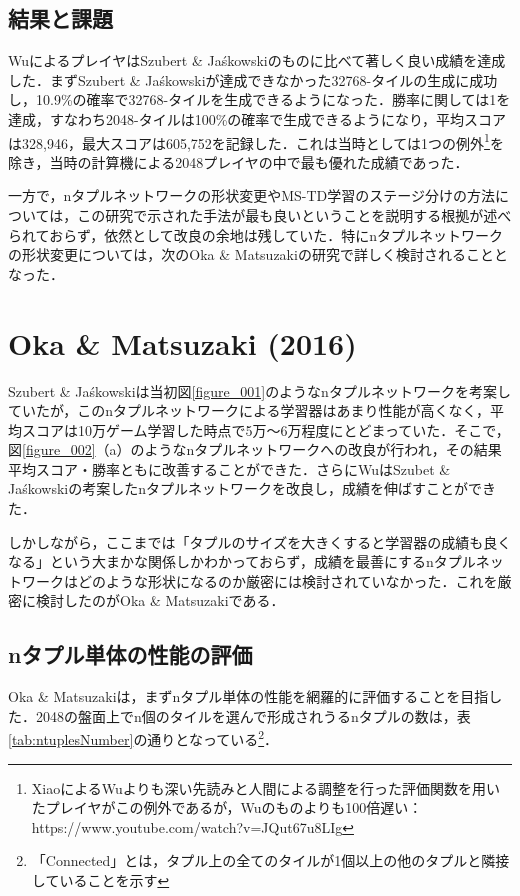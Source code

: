 \documentclass{suribt}
\begin{document}
\subsection{結果と課題}
WuによるプレイヤはSzubert \& Ja\'{s}kowskiのものに比べて著しく良い成績を達成した．まずSzubert \& Ja\'{s}kowskiが達成できなかった32768-タイルの生成に成功し，10.9\%の確率で32768-タイルを生成できるようになった．勝率に関しては1を達成，すなわち2048-タイルは100\%の確率で生成できるようになり，平均スコアは328,946，最大スコアは605,752を記録した．これは当時としては1つの例外\footnote{XiaoによるWuよりも深い先読みと人間による調整を行った評価関数を用いたプレイヤがこの例外であるが，Wuのものよりも100倍遅い：https://www.youtube.com/watch?v=JQut67u8LIg}を除き，当時の計算機による2048プレイヤの中で最も優れた成績であった．

一方で，nタプルネットワークの形状変更やMS-TD学習のステージ分けの方法については，この研究で示された手法が最も良いということを説明する根拠が述べられておらず，依然として改良の余地は残していた．特にnタプルネットワークの形状変更については，次のOka \& Matsuzakiの研究で詳しく検討されることとなった．

\section{Oka \& Matsuzaki (2016)}
Szubert \& Ja\'{s}kowskiは当初図\ref{figure_001}のようなnタプルネットワークを考案していたが，このnタプルネットワークによる学習器はあまり性能が高くなく，平均スコアは10万ゲーム学習した時点で5万〜6万程度にとどまっていた．そこで，図\ref{figure_002}（a）のようなnタプルネットワークへの改良が行われ，その結果平均スコア・勝率ともに改善することができた．さらにWuはSzubet \& Ja\'{s}kowskiの考案したnタプルネットワークを改良し，成績を伸ばすことができた．

しかしながら，ここまでは「タプルのサイズを大きくすると学習器の成績も良くなる」という大まかな関係しかわかっておらず，成績を最善にするnタプルネットワークはどのような形状になるのか厳密には検討されていなかった．これを厳密に検討したのがOka \& Matsuzakiである．

\subsection{nタプル単体の性能の評価}
Oka \& Matsuzakiは，まずnタプル単体の性能を網羅的に評価することを目指した．2048の盤面上でn個のタイルを選んで形成されうるnタプルの数は，表\ref{tab:ntuplesNumber}の通りとなっている\footnote{「Connected」とは，タプル上の全てのタイルが1個以上の他のタプルと隣接していることを示す}．
\end{document}
